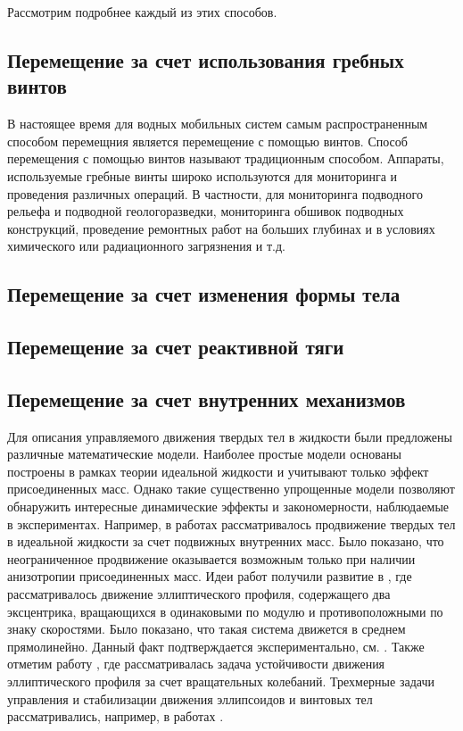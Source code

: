Рассмотрим подробнее каждый из этих способов.

\subsection{Перемещение за счет использования гребных винтов}\label{sec:ch1/sec2}

В настоящее время для водных мобильных систем самым распространенным способом перемещния является перемещение с помощью винтов. Способ перемещения с помощью винтов называют традиционным способом. Аппараты, используемые гребные винты широко используются для мониторинга и проведения различных операций. В частности, для мониторинга подводного рельефа и подводной геологоразведки, мониторинга обшивок подводных конструкций, проведение ремонтных работ на больших глубинах и в условиях химического или радиационного загрязнения и т.д. 





\subsection{Перемещение за счет изменения формы тела}\label{sec:ch1/sec3}


\subsection{Перемещение за счет реактивной тяги}\label{sec:ch1/sec4}



\subsection{Перемещение за счет внутренних механизмов}\label{sec:ch1/sec5}

Для описания управляемого движения твердых тел в жидкости были предложены различные математические модели. Наиболее простые модели основаны построены в рамках теории идеальной жидкости и учитывают только эффект присоединенных масс. Однако такие существенно упрощенные модели позволяют обнаружить интересные динамические эффекты и закономерности, наблюдаемые в экспериментах. Например, в работах \cite{Kozlov_Ramodanov_2001, Kozlov_Onischenko_2003} рассматривалось продвижение твердых тел в идеальной жидкости за счет подвижных внутренних масс. Было показано, что неограниченное продвижение оказывается возможным только при наличии анизотропии присоединенных масс. Идеи работ \cite{Kozlov_Ramodanov_2001, Kozlov_Onischenko_2003} получили развитие в \cite{Vetchanin_Kilin_2016}, где рассматривалось движение эллиптического профиля, содержащего два эксцентрика, вращающихся в одинаковыми по модулю и противоположными по знаку скоростями. Было показано, что такая система движется в среднем прямолинейно. Данный факт подтверждается экспериментально, см. \cite{Klenov_Kilin_2016}. Также отметим работу \cite{Jing_Kanso_2013}, где рассматривалась задача устойчивости движения эллиптического профиля за счет вращательных колебаний. Трехмерные задачи управления и стабилизации движения эллипсоидов и винтовых тел рассматривались, например, в работах \cite{Borisov_et_al_2017, Vetchanin_Mamaev_2017, Vetchanin_et_al_2016, Woolsey_Leonard_1999}.


